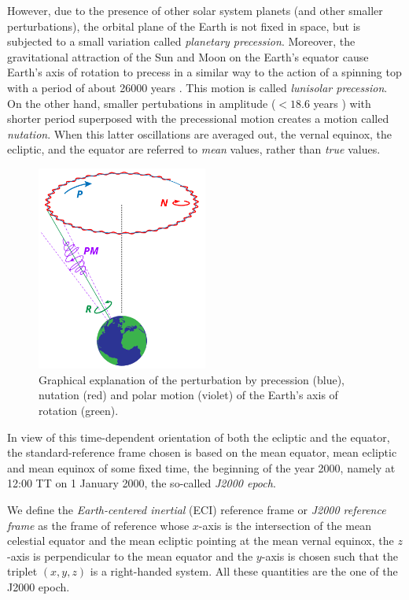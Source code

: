 \documentclass[../main.tex]{subfiles}
\begin{document}
However, due to the presence of other solar system planets (and other smaller perturbations), the orbital plane of the Earth is not fixed in space, but is subjected to a small variation called \emph{planetary precession}. Moreover, the gravitational attraction of the Sun and Moon on the Earth's equator cause Earth's axis of rotation to precess in a similar way to the action of a spinning top with a period of about 26000 years \cite{montenbruck}. This motion is called \emph{lunisolar precession}. On the other hand, smaller pertubations in amplitude ($<18.6$ years \cite{wiki:eci}) with shorter period superposed with the precessional motion creates a motion called \emph{nutation}. When this latter oscillations are averaged out, the vernal equinox, the ecliptic, and the equator are referred to \emph{mean} values, rather than \emph{true} values.

\begin{figure}[ht]
  \centering
  \includegraphics[width=0.5\textwidth]{Images/precession_nutation.pdf}
  \caption{Graphical explanation of the perturbation by precession (blue), nutation (red) and polar motion (violet) of the Earth's axis of rotation (green). }
  \label{fig:prec_nut}
\end{figure}

In view of this time-dependent orientation of both the ecliptic and the equator, the standard-reference frame chosen is based on the mean equator, mean ecliptic and mean equinox of some fixed time, the beginning of the year 2000, namely at 12:00 TT on 1 January 2000, the so-called \emph{J2000 epoch}.
\begin{definition}
  We define the \emph{Earth-centered inertial} (ECI) reference frame or \emph{J2000 reference frame} as the frame of reference whose $x$-axis is the intersection of the mean celestial equator and the mean ecliptic pointing at the mean vernal equinox, the $z$-axis is perpendicular to the mean equator and the $y$-axis is chosen such that the triplet $(x,y,z)$ is a right-handed system. All these quantities are the one of the J2000 epoch.
\end{definition}
\end{document}
